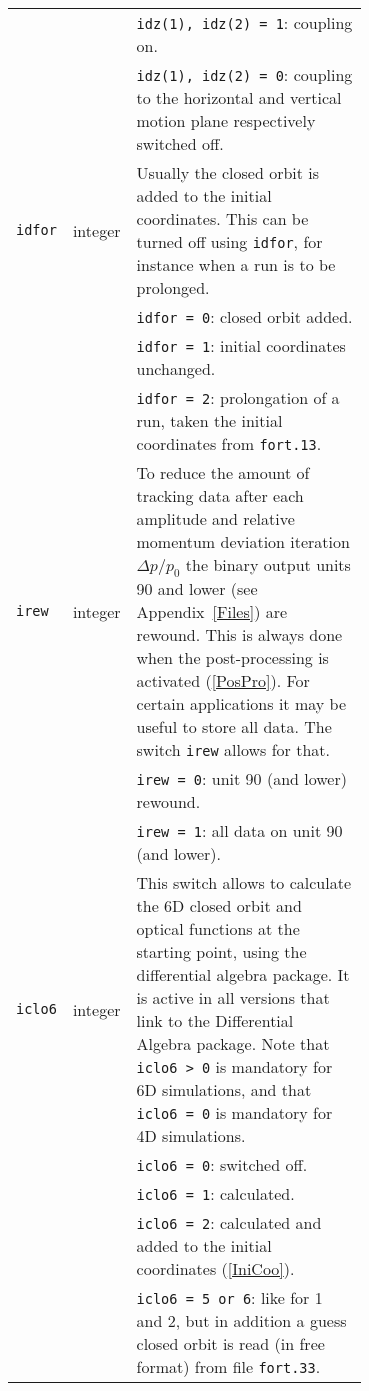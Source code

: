 \begin{longtabu}{@{}llp{0.7\linewidth}}
                           &          & \texttt{idz(1), idz(2) = 1}: coupling on. \\
                           &          & \texttt{idz(1), idz(2) = 0}: coupling to the horizontal and vertical motion plane respectively switched off. \\
    \texttt{idfor}         & integer  & Usually the closed orbit is added to the initial coordinates. This can be turned off using \texttt{idfor}, for instance when a run is to be prolonged. \\
                           &          & \texttt{idfor = 0}: closed orbit added. \\
                           &          & \texttt{idfor = 1}: initial coordinates unchanged. \\
                           &          & \texttt{idfor = 2}: prolongation of a run, taken the initial coordinates from \texttt{fort.13}. \\
    \texttt{irew}          & integer  & To reduce the amount of tracking data after each amplitude and relative momentum deviation iteration $\Delta p/p_0$ the binary output units 90 and lower (see Appendix~\ref{Files}) are rewound. This is always done when the post-processing is activated (\ref{PosPro}). For certain applications it may be useful to store all data. The switch \texttt{irew} allows for that. \\
                           &          & \texttt{irew = 0}: unit 90 (and lower) rewound. \\
                           &          & \texttt{irew = 1}: all data on unit 90 (and lower). \\
    \texttt{iclo6}         & integer  & This switch allows to calculate the 6D closed orbit and optical functions at the starting point, using the differential algebra package. It is active in all versions that link to the Differential Algebra package.  Note that \texttt{iclo6 > 0} is mandatory for 6D simulations, and that \texttt{iclo6 = 0} is mandatory for 4D simulations. \\
                           &          & \texttt{iclo6 = 0}: switched off. \\
                           &          & \texttt{iclo6 = 1}: calculated. \\
                           &          & \texttt{iclo6 = 2}: calculated and added to the initial coordinates (\ref{IniCoo}). \\
                           &          & \texttt{iclo6 = 5 or 6}: like for 1 and 2, but in addition a guess closed orbit is read (in free format) from file \texttt{fort.33}. \\

\end{longtabu}
